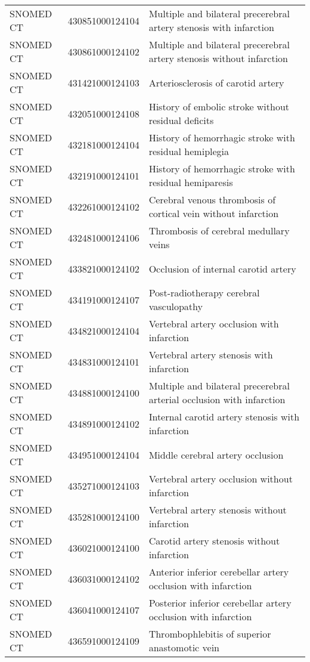 \begin{longtable}{p{}p{}p{}}
  SNOMED CT & 430851000124104 & Multiple and bilateral precerebral artery stenosis with infarction \\ 
  SNOMED CT & 430861000124102 & Multiple and bilateral precerebral artery stenosis without infarction \\ 
  SNOMED CT & 431421000124103 & Arteriosclerosis of carotid artery \\ 
  SNOMED CT & 432051000124108 & History of embolic stroke without residual deficits \\ 
  SNOMED CT & 432181000124104 & History of hemorrhagic stroke with residual hemiplegia \\ 
  SNOMED CT & 432191000124101 & History of hemorrhagic stroke with residual hemiparesis \\ 
  SNOMED CT & 432261000124102 & Cerebral venous thrombosis of cortical vein without infarction \\ 
  SNOMED CT & 432481000124106 & Thrombosis of cerebral medullary veins \\ 
  SNOMED CT & 433821000124102 & Occlusion of internal carotid artery \\ 
  SNOMED CT & 434191000124107 & Post-radiotherapy cerebral vasculopathy \\ 
  SNOMED CT & 434821000124104 & Vertebral artery occlusion with infarction \\ 
  SNOMED CT & 434831000124101 & Vertebral artery stenosis with infarction \\ 
  SNOMED CT & 434881000124100 & Multiple and bilateral precerebral arterial occlusion with infarction \\ 
  SNOMED CT & 434891000124102 & Internal carotid artery stenosis with infarction \\ 
  SNOMED CT & 434951000124104 & Middle cerebral artery occlusion \\ 
  SNOMED CT & 435271000124103 & Vertebral artery occlusion without infarction \\ 
  SNOMED CT & 435281000124100 & Vertebral artery stenosis without infarction \\ 
  SNOMED CT & 436021000124100 & Carotid artery stenosis without infarction \\ 
  SNOMED CT & 436031000124102 & Anterior inferior cerebellar artery occlusion with infarction \\ 
  SNOMED CT & 436041000124107 & Posterior inferior cerebellar artery occlusion with infarction \\ 
  SNOMED CT & 436591000124109 & Thrombophlebitis of superior anastomotic vein \\ 

\end{longtable}
